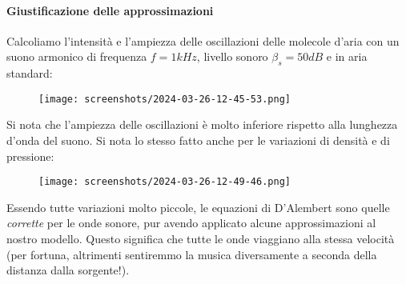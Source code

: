 \paragraph{Giustificazione delle approssimazioni}
Calcoliamo l'intensità e l'ampiezza delle oscillazioni delle molecole d'aria con un suono armonico di frequenza \(f= 1 \unit{kHz}\), livello sonoro \(\beta _s = 50 \unit{dB}\) e in aria standard:
\begin{figure}[H]
	\centering
	\texttt{[image: screenshots/2024-03-26-12-45-53.png]}
\end{figure}
Si nota che l'ampiezza delle oscillazioni è molto inferiore rispetto alla lunghezza d'onda del suono. Si nota lo stesso fatto anche per le variazioni di densità e di pressione:
\begin{figure}[H]
	\centering
	\texttt{[image: screenshots/2024-03-26-12-49-46.png]}
\end{figure}
Essendo tutte variazioni molto piccole, le equazioni di D'Alembert sono quelle \emph{corrette} per le onde sonore, pur avendo applicato alcune approssimazioni al nostro modello. Questo significa che tutte le onde viaggiano alla stessa velocità (per fortuna, altrimenti sentiremmo la musica diversamente a seconda della distanza dalla sorgente!).